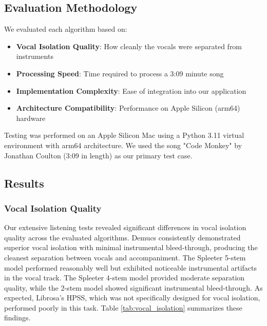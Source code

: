 \documentclass[conference]{IEEEtran}
\begin{document}
\subsection{Evaluation Methodology}
We evaluated each algorithm based on:
\begin{itemize}
    \item \textbf{Vocal Isolation Quality}: How cleanly the vocals were separated from instruments
    \item \textbf{Processing Speed}: Time required to process a 3:09 minute song
    \item \textbf{Implementation Complexity}: Ease of integration into our application
    \item \textbf{Architecture Compatibility}: Performance on Apple Silicon (arm64) hardware
\end{itemize}

Testing was performed on an Apple Silicon Mac using a Python 3.11 virtual environment with arm64 architecture. We used the song "Code Monkey" by Jonathan Coulton (3:09 in length) as our primary test case.

\subsection{Results}

\subsubsection{Vocal Isolation Quality}
Our extensive listening tests revealed significant differences in vocal isolation quality across the evaluated algorithms. Demucs consistently demonstrated superior vocal isolation with minimal instrumental bleed-through, producing the cleanest separation between vocals and accompaniment. The Spleeter 5-stem model performed reasonably well but exhibited noticeable instrumental artifacts in the vocal track. The Spleeter 4-stem model provided moderate separation quality, while the 2-stem model showed significant instrumental bleed-through. As expected, Librosa's HPSS, which was not specifically designed for vocal isolation, performed poorly in this task. Table \ref{tab:vocal_isolation} summarizes these findings.
\end{document}
